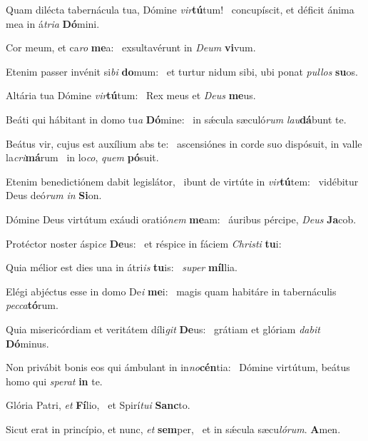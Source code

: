 \item Quam dilécta tabernácula tua, Dómine \textit{vir}\textbf{tú}tum!~\psstar{} concupíscit, et déficit ánima mea in á\textit{tria} \textbf{Dó}mini.
\item Cor meum, et ca\textit{ro} \textbf{me}a:~\psstar{} exsultavérunt in \textit{Deum} \textbf{vi}vum.
\item Etenim passer invénit si\textit{bi} \textbf{do}mum:~\psstar{} et turtur nidum sibi, ubi ponat \textit{pullos} \textbf{su}os.
\item Altária tua Dómine \textit{vir}\textbf{tú}\-tum:~\psstar{} Rex meus et \textit{Deus} \textbf{me}us.
\item Beáti qui hábitant in domo tu\textit{a} \textbf{Dó}mine:~\psstar{} in sǽcula sæculó\textit{rum} \textit{lau}\textbf{dá}bunt te.
\item Beátus vir, cujus est auxílium abs te:~\pscross{} ascensiónes in corde suo dispósuit, in valle la\textit{cri}\textbf{má}rum~\psstar{} in lo\textit{co}, \textit{quem} \textbf{pó}suit.
\item Etenim benedictiónem dabit legislátor,~\pscross{} ibunt de virtúte in \textit{vir}\textbf{tú}tem:~\psstar{} vidébitur Deus deó\textit{rum} \textit{in} \textbf{Si}on.
\item Dómine Deus virtútum exáudi oratió\textit{nem} \textbf{me}am:~\psstar{} áuribus pércipe, \textit{Deus} \textbf{Ja}cob.
\item Protéctor noster áspi\textit{ce} \textbf{De}us:~\psstar{} et réspice in fáciem \textit{Christi} \textbf{tu}i:
\item Quia mélior est dies una in átri\textit{is} \textbf{tu}is:~\psstar{} \textit{super} \textbf{míl}lia.
\item Elégi abjéctus esse in domo De\textit{i} \textbf{me}i:~\psstar{} magis quam habitáre in tabernáculis \textit{pecca}\textbf{tó}rum.
\item Quia misericórdiam et veritátem díli\textit{git} \textbf{De}us:~\psstar{} grátiam et glóriam \textit{dabit} \textbf{Dó}minus.
\item Non privábit bonis eos qui ámbulant in in\textit{no}\textbf{cén}tia:~\psstar{} Dómine virtútum, beátus homo qui \textit{sperat} \textbf{in} te.
\item Glória Patri, \textit{et} \textbf{Fí}lio,~\psstar{} et Spirí\textit{tui} \textbf{Sanc}to.
\item Sicut erat in princípio, et nunc, \textit{et} \textbf{sem}per,~\psstar{} et in sǽcula sæcu\textit{lórum}. \textbf{A}men.